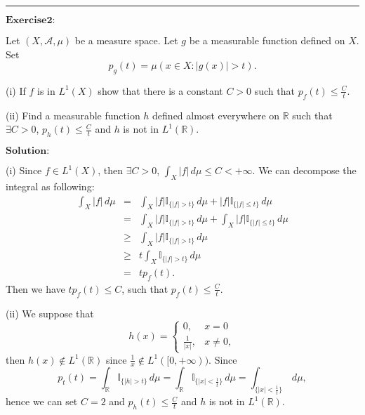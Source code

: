 \documentclass[12pt]{article}
\begin{document}
\vspace{8pt}

\noindent\rule[0.25\baselineskip]{\textwidth}{0.5pt}


$\textbf{Exercise2:}$

Let $(X, \mathcal{A}, \mu)$ be a measure space. Let $g$ be a measurable function defined on $X$. Set 
\begin{equation*}
    p_{g} (t) = \mu ({x \in X : |g(x)| > t}).
\end{equation*}

(i) If $f$ is in $L^{1}(X)$ show that there is a constant $C > 0$ such that $p_{f}(t) \leq \frac{C}{t}$.

(ii) Find a measurable function $h$ defined almost everywhere on $\mathbb{R}$ such that $\exists C > 0$, $p_{h} (t) \leq \frac{C}{t}$ and $h$ is not in $L^{1}(\mathbb{R})$.

\vspace{8pt}
$\textbf{Solution:}$

(i) Since $f \in L^{1}(X)$, then $\exists C > 0$, $\int_{X}^{} |f| \, d \mu \leq C < + \infty$. We can decompose the integral as following:
\begin{eqnarray*}
\int_{X}^{} |f| \, d \mu &=& \int_{X}^{} |f| \mathbb{I}_{\{|f| > t\}} \, d \mu + |f| \mathbb{I}_{\{|f| \leq t\}} \, d \mu  \\
            &=& \int_{X}^{} |f| \mathbb{I}_{\{|f| > t\}} \, d \mu + \int_{X}^{} |f| \mathbb{I}_{\{|f| \leq t\}} \, d \mu  \\
            &\geq & \int_{X}^{} |f| \mathbb{I}_{\{|f| > t\}} \, d \mu  \\
            & \geq & t \int_{X}^{} \mathbb{I}_{\{|f| > t\}} \, d \mu \\
            & = & t p_{f}(t).
\end{eqnarray*}
Then we have $t p_{f}(t) \leq C$, such that $p_{f}(t) \leq \frac{C}{t}$.

(ii) We suppose that 
\begin{equation*}
h(x) =
\left\{
             \begin{array}{cl}
             0, & x = 0 \\
             \frac{1}{|x|}, & x \neq 0,
             \end{array}
\right.
\end{equation*}
then $h(x) \notin L^{1}(\mathbb{R})$ since $\frac{1}{x} \notin L^{1}([0, + \infty))$. Since
\begin{equation*}
p_{t}(t) = \int_{\mathbb{R}}^{} \mathbb{I}_{\{|h| > t\}} \, d \mu  = \int_{\mathbb{R}}^{} \mathbb{I}_{\{|x| < \frac{1}{t} \}} \, d \mu  =  \int_{\{|x| < \frac{1}{t} \}}^{} \, d \mu,
\end{equation*}
hence we can set $C = 2$ and $p_{h} (t) \leq \frac{C}{t}$ and $h$ is not in $L^{1}(\mathbb{R})$.
\end{document}
